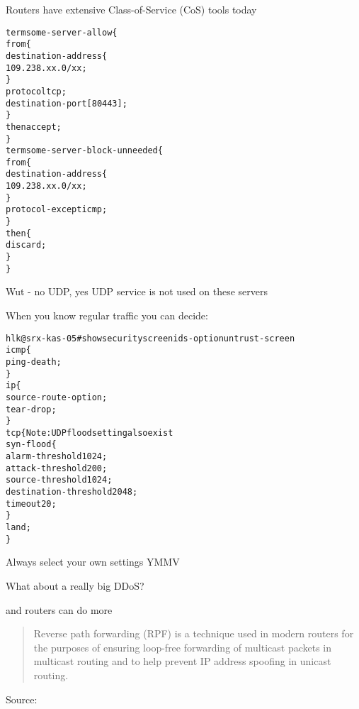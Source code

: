 \documentclass[20pt,landscape,a4paper,footrule]{foils}
\begin{document}
Routers have extensive Class-of-Service (CoS) tools today


\begin{alltt}\footnotesize
term some-server-allow \{
    from \{
        destination-address \{
            109.238.xx.0/xx;
        \}
        protocol tcp;
        destination-port [ 80 443 ];
    \}
    then accept;
\}
term some-server-block-unneeded \{
    from \{
        destination-address \{
            109.238.xx.0/xx;
        \}
        protocol-except icmp;
    \}
    then \{
        discard;
    \}
\}
\end{alltt}

Wut - no UDP, yes UDP service is not used on these servers



When you know regular traffic you can decide:

\begin{alltt}\footnotesize
hlk@srx-kas-05# show security screen ids-option untrust-screen
icmp \{
    ping-death;
\}
ip \{
    source-route-option;
    tear-drop;
\}
tcp \{    Note: UDP flood setting also exist
    syn-flood \{
        alarm-threshold 1024;
        attack-threshold 200;
        source-threshold 1024;
        destination-threshold 2048;
        timeout 20;
    \}
    land;
\}
\end{alltt}

Always select your own settings YMMV


\begin{list1}
\item What about a really big DDoS?
\item and routers can do more
\end{list1}





\begin{quote}
Reverse path forwarding (RPF) is a technique used in modern routers for the purposes of ensuring loop-free forwarding of multicast packets in multicast routing and to help prevent IP address spoofing in unicast routing.
\end{quote}
Source: 

\end{document}
